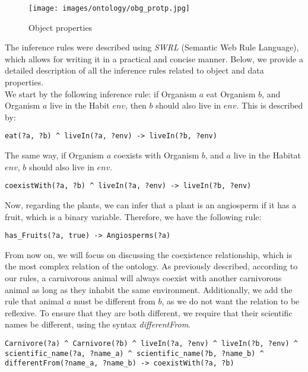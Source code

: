 \begin{figure}[H]
    \centering
    \texttt{[image: images/ontology/obg\_protp.jpg]}
    \caption{Object properties}
    \label{fig:diagram}
\end{figure}

The inference rules were described using \textit{SWRL} (Semantic Web Rule Language), which allows for writing it in a practical and concise manner. Below, we provide a detailed description of all the inference rules related to object and data properties.
\\

We start by the following inference rule: if Organism $a$ eat Organism $b$, and Organism $a$ live in the Habit $env$, then $b$ should also live in $env$. This is described by:
\\

\begin{lstlisting}
eat(?a, ?b) ^ liveIn(?a, ?env) -> liveIn(?b, ?env)
\end{lstlisting}


The same way, if Organism $a$ coexists with Organism $b$, and $a$ live in the Habitat $env$, $b$ should also live in $env$.
\\

\begin{lstlisting}
coexistWith(?a, ?b) ^ liveIn(?a, ?env) -> liveIn(?b, ?env)
\end{lstlisting}

Now, regarding the plants, we can infer that a plant is an angiosperm if it has a fruit, which is a binary variable. Therefore, we have the following rule:
\\

\begin{lstlisting}
has_Fruits(?a, true) -> Angiosperms(?a)
\end{lstlisting}

From now on, we will focus on discussing the coexistence relationship, which is the most complex relation of the ontology. As previously described, according to our rules, a carnivorous animal will always coexist with another carnivorous animal as long as they inhabit the same environment. Additionally, we add the rule that animal $a$ must be different from $b$, as we do not want the relation to be reflexive. To ensure that they are both different, we require that their scientific names be different, using the syntax \textit{differentFrom}.
\\

\begin{lstlisting}
Carnivore(?a) ^ Carnivore(?b) ^ liveIn(?a, ?env) ^ liveIn(?b, ?env) ^ scientific_name(?a, ?name_a) ^ scientific_name(?b, ?name_b) ^ differentFrom(?name_a, ?name_b) -> coexistWith(?a, ?b)
\end{lstlisting}

